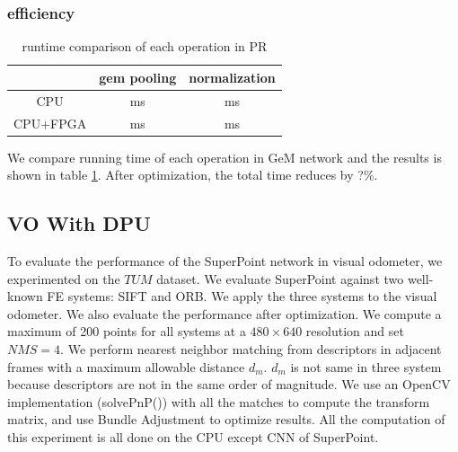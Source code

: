 \subsubsection{efficiency}

\begin{table}
    \label{tab:gem_eff}
    \centering 
    \caption{runtime comparison of each operation in PR}
    \begin{tabular}{|c|c|c|}
				\hline
              & gem pooling & normalization \\
        \hline
        CPU   &   ms &   ms \\
        \hline
        CPU+FPGA &   ms &   ms \\
			  \hline
    \end{tabular}
  \end{table}

We compare running time of each operation in GeM network and the results is shown in table \ref{tab:gem_eff}. After optimization, the total time reduces by ?\%.


\subsection{ VO With DPU }

To evaluate the performance of the SuperPoint network in visual odometer, we experimented on the $TUM$ dataset. We evaluate SuperPoint against two well-known FE systems: SIFT\cite{Lowe-478} and ORB\cite{RubleeRabaud-479}. We apply the three systems to the visual odometer. We also evaluate the performance after optimization. We compute a maximum of 200 points for all systems at a $480\times640$ resolution and set $NMS=4$. We perform nearest neighbor matching from descriptors in adjacent frames with a maximum allowable distance $d_m$. $d_m$ is not same in three system because descriptors are not in the same order of magnitude. We use an OpenCV implementation (solvePnP()) with all the matches to compute the transform matrix, and use Bundle Adjustment to optimize results. All the computation of this experiment is all done on the CPU except CNN of SuperPoint. 

